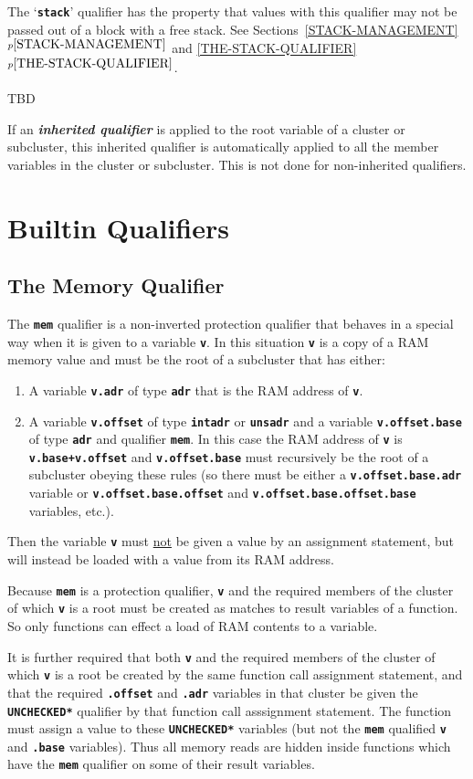 \documentclass[12pt]{article}
\makeatletter
\newcommand{\TT}[1]{{\tt \bfseries #1}}
\newcommand{\key}[1]{{\bf \em #1}\index{#1}}
\newcommand{\ttkey}[1]{\TT{#1}\index{#1@{\tt #1}}}
\newcommand{\itemref}[1]{\ref{#1}$^{p\pageref{#1}}$}
\makeatother
\begin{document}
The `\TT{stack}' qualifier has the property that values with
this qualifier may not be passed out of a block with a free
stack.  See Sections~\itemref{STACK-MANAGEMENT} and
\itemref{THE-STACK-QUALIFIER}.

TBD

If an \key{inherited qualifier}\label{INHERITED-QUALIFIER}
is applied to the root variable of a cluster
or subcluster, this inherited qualifier is automatically applied to all
the member variables in the cluster or subcluster.  This is not done
for non-inherited qualifiers.

\section{Builtin Qualifiers}
\label{BUILTIN-QUALIFIERS}

\subsection{The Memory Qualifier}
\label{THE-MEM-QUALIFIER}

The \ttkey{mem} qualifier is a non-inverted protection qualifier that behaves
in a special way when it is given to a variable \TT{v}.
In this situation \TT{v} is a copy of a RAM memory value and
must be the root of a subcluster that
has either:
\begin{enumerate}
\item
A variable \TT{v.adr} of type \TT{adr} that is the RAM address of \TT{v}.

\item
A variable \TT{v.offset} of type \TT{intadr} or \TT{unsadr} and
a variable \TT{v.offset.base} of type \TT{adr} and qualifier \TT{mem}.
In this case the RAM address of \TT{v} is \TT{v.base+v.offset} and
\TT{v.offset.base} must recursively be the root of a subcluster obeying
these rules (so there must be either a \TT{v.offset.base.adr} variable
or \TT{v.offset.base.offset} and \TT{v.offset.base.offset.base}
variables, etc.).
\end{enumerate}
Then the
variable \TT{v} must \underline{not} be given a value by an
assignment statement, but will instead be loaded with a value
from its RAM address.

Because \TT{mem} is a protection qualifier, \TT{v} and the required
members of the cluster of which \TT{v} is a root
must be created as matches to result variables of a function.
So only functions can effect a load of RAM contents to a variable.

It is further required that both \TT{v} and the required members of
the cluster of which \TT{v} is a root be created
by the same function call assignment statement, and that the required
\TT{.offset} and \TT{.adr} variables in that cluster
be given the \TT{*UNCHECKED*} qualifier by that function
call asssignment statement.
The function must assign a value to these \TT{*UNCHECKED*} variables
(but not the \TT{mem} qualified \TT{v} and \TT{.base} variables).
Thus all memory reads are hidden
inside functions which have the \TT{mem} qualifier on some of
their result variables.
\end{document}
